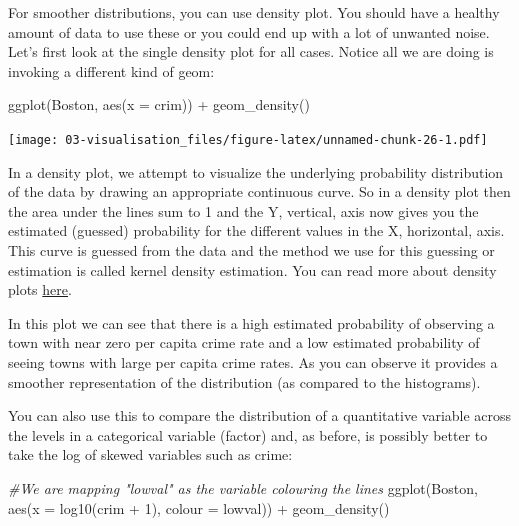\documentclass[
]{book}
\newenvironment{Shaded}{\begin{snugshade}}{\end{snugshade}}
\newcommand{\AttributeTok}[1]{\textcolor[rgb]{0.77,0.63,0.00}{#1}}
\newcommand{\CommentTok}[1]{\textcolor[rgb]{0.56,0.35,0.01}{\textit{#1}}}
\newcommand{\DecValTok}[1]{\textcolor[rgb]{0.00,0.00,0.81}{#1}}
\newcommand{\FunctionTok}[1]{\textcolor[rgb]{0.00,0.00,0.00}{#1}}
\newcommand{\NormalTok}[1]{#1}
\newcommand{\SpecialCharTok}[1]{\textcolor[rgb]{0.00,0.00,0.00}{#1}}
\begin{document}
For smoother distributions, you can use density plot. You should have a healthy amount of data to use these or you could end up with a lot of unwanted noise. Let's first look at the single density plot for all cases. Notice all we are doing is invoking a different kind of geom:

\begin{Shaded}
\begin{Highlighting}[]
\FunctionTok{ggplot}\NormalTok{(Boston, }\FunctionTok{aes}\NormalTok{(}\AttributeTok{x =}\NormalTok{ crim)) }\SpecialCharTok{+}
  \FunctionTok{geom\_density}\NormalTok{() }
\end{Highlighting}
\end{Shaded}

\texttt{[image: 03-visualisation\_files/figure-latex/unnamed-chunk-26-1.pdf]}

In a density plot, we attempt to visualize the underlying probability distribution of the data by drawing an appropriate continuous curve. So in a density plot then the area under the lines sum to 1 and the Y, vertical, axis now gives you the estimated (guessed) probability for the different values in the X, horizontal, axis. This curve is guessed from the data and the method we use for this guessing or estimation is called kernel density estimation. You can read more about density plots \href{https://serialmentor.com/dataviz/histograms-density-plots.html}{here}.

In this plot we can see that there is a high estimated probability of observing a town with near zero per capita crime rate and a low estimated probability of seeing towns with large per capita crime rates. As you can observe it provides a smoother representation of the distribution (as compared to the histograms).

You can also use this to compare the distribution of a quantitative variable across the levels in a categorical variable (factor) and, as before, is possibly better to take the log of skewed variables such as crime:

\begin{Shaded}
\begin{Highlighting}[]
\CommentTok{\#We are mapping "lowval" as the variable colouring the lines }
\FunctionTok{ggplot}\NormalTok{(Boston, }\FunctionTok{aes}\NormalTok{(}\AttributeTok{x =} \FunctionTok{log10}\NormalTok{(crim }\SpecialCharTok{+} \DecValTok{1}\NormalTok{), }\AttributeTok{colour =}\NormalTok{ lowval)) }\SpecialCharTok{+} 
  \FunctionTok{geom\_density}\NormalTok{() }
\end{Highlighting}
\end{Shaded}
\end{document}
